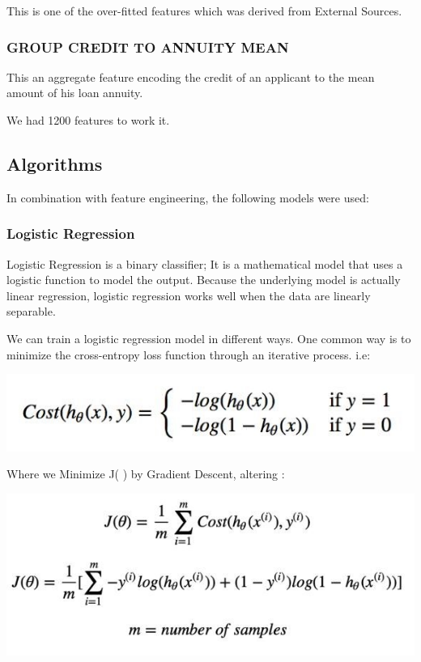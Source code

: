 \documentclass[sigconf, nonacm]{acmart}
\begin{document}
This is one of the over-fitted features which was derived from External Sources.

\subsubsection{GROUP CREDIT TO ANNUITY MEAN}

This an aggregate feature encoding the credit of an applicant to the mean amount of his loan annuity.

We had 1200 features to work it.

\subsection{Algorithms}

In combination with feature engineering, the following models were used:

\subsubsection{Logistic Regression}

Logistic Regression is a binary classifier; It is a mathematical model that uses a logistic function to model the output. Because the underlying model is actually linear regression, logistic regression works well when the data are linearly separable.

We can train a logistic regression model in different ways. One common way is to minimize the cross-entropy loss function through an iterative process. i.e:

\includegraphics[width=\linewidth]{figures/EQN1.jpg}

Where we Minimize J( ) by Gradient Descent, altering :

\includegraphics[width=\linewidth]{figures/EQN2.jpg}
\end{document}
